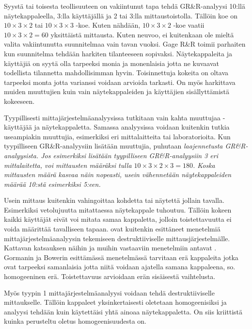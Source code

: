 \documentclass[12pt,a4paper,finnish]{tutthesis}
\begin{document}
Syystä tai toisesta teollisuuteen on vakiintunut tapa tehdä GR\&R-analyysi
10:llä näytekappaleella, 3:lla käyttäjällä ja 2 tai 3:lla mittaustoistolla.
Tällöin koe on $10 \times 3 \times 2$ tai $10 \times 3 \times 3$ -koe.
Kuten nähdään, $10 \times 3 \times 2$ -koe vaatii $10 \times 3 \times 2 = 60$
yksittäistä mittausta. Kuten \textcite{kitska2014} neuvoo, ei kuitenkaan ole mieltä
valita vakiintunutta suunnitelmaa vain tavan vuoksi. Gage R\&R toimii
parhaiten kun suunnitelma tehdään harkiten tilanteeseen sopivaksi.
Näytekappaleita ja käyttäjiä on syytä olla tarpeeksi monia ja monenlaisia
jotta ne kuvaavat todellista tilannetta mahdollisimman hyvin.
Toisinnettuja kokeita on oltava tarpeeksi monta jotta varianssi voidaan
arvioida tarkasti. On myös harkittava muiden muuttujien kuin vain näytekappaleiden
ja käyttäjien sisällyttämistä kokeeseen.

Tyypillisesti mittajärjestelmäanalyysissa tutkitaan vain kahta muuttujaa -
käyttäjää ja näytekappaletta. Samassa analyysissa voidaan kuitenkin
tutkia useampiakin muuttujia, esimerkiksi eri mittalaitteita tai laboratorioita. Kun
tyypilliseen GR\&R-analyysiin lisätään muuttujia, puhutaan
\em laajennetusta \em GR\&R-analyysista. Jos esimerkiksi lisätään
tyypilliseen GR\&R-analyysiin 3 eri mittalaitetta, voi mittausten määräksi
tulla $10 \times 3 \times 2 \times 3 = 180$. Koska mittausten määrä
kasvaa näin nopeasti, usein vähennetään näytekappaleiden määrää
10:stä esimerkiksi 5:een.



Usein mittaus kuitenkin vahingoittaa kohdetta tai näytettä jollain tavalla.
Esimerkiksi vetolujuutta mitattaessa näytekappale tuhoutuu. Tällöin
kokeen kaikki käyttäjät eivät voi mitata samaa kappaletta, jolloin toistettavuutta
ei voida määrittää tavalliseen tapaan. \textcite{mitchell1997,bergeret2002improving}
ovat kuitenkin esittäneet menetelmiä mittajärjestelmäanalyysin tekemiseen
destruktiiviselle mittausjärjestelmälle. Kattavan katsauksen näihin ja
muihin vastaaviin menetelmiin antavat \textcite{Mast2005}.
Gormanin ja Bowerin \parencite*{Gorman2002} esittämässä menetelmässä tarvitaan erä kappaleita
jotka ovat tarpeeksi samanlaisia jotta niitä voidaan ajatella samana kappaleena,
so. homogeeninen erä. Toistettavuus arvioidaan erän sisäisestä vaihtelusta.

Myös tyypin 1 mittajärjestelmäanalyysi voidaan tehdä destruktiiviselle
mittaukselle. Tällöin kappaleet yksinkertaisesti oletetaan homogeenisiksi
ja analyysi tehdään kuin käytettäisi yhtä ainoaa näytekappaletta.
On siis kriittistä kuinka perusteltu oletus homogeenisuudesta on.
\end{document}

